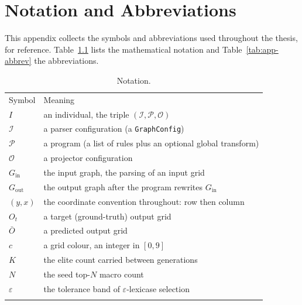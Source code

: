 \chapter{Notation and Abbreviations}
\label{app:notation}

This appendix collects the symbols and abbreviations used throughout the thesis, for
reference. Table~\ref{tab:app-notation} lists the mathematical notation and
Table~\ref{tab:app-abbrev} the abbreviations.

\begin{table}[htbp]
\centering
\caption{Notation.}
\label{tab:app-notation}
\small
\begin{tabular}{p{2.6cm}p{10.4cm}}
\hline\noalign{\smallskip}
Symbol & Meaning \\
\noalign{\smallskip}\hline\noalign{\smallskip}
$I$ & an individual, the triple $(\mathcal{I}, \mathcal{P}, \mathcal{O})$ \\
$\mathcal{I}$ & a parser configuration (a \texttt{GraphConfig}) \\
$\mathcal{P}$ & a program (a list of rules plus an optional global transform) \\
$\mathcal{O}$ & a projector configuration \\
$G_{\mathrm{in}}$ & the input graph, the parsing of an input grid \\
$G_{\mathrm{out}}$ & the output graph after the program rewrites $G_{\mathrm{in}}$ \\
$(y, x)$ & the coordinate convention throughout: row then column \\
$O_t$ & a target (ground-truth) output grid \\
$\bar{O}$ & a predicted output grid \\
$c$ & a grid colour, an integer in $[0, 9]$ \\
$K$ & the elite count carried between generations \\
$N$ & the seed top-$N$ macro count \\
$\varepsilon$ & the tolerance band of $\varepsilon$-lexicase selection \\
\noalign{\smallskip}\hline
\end{tabular}
\end{table}

